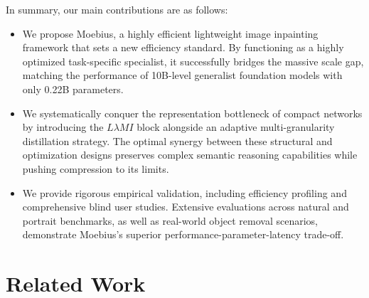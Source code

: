 \documentclass[runningheads]{llncs}
\begin{document}
\vspace{-0.01em}
In summary, our main contributions are as follows:
\vspace{-0.4em}
\begin{itemize}
    \item We propose Moebius, a highly efficient lightweight image inpainting framework that sets a new efficiency standard. By functioning as a highly optimized task-specific specialist, it successfully bridges the massive scale gap, matching the performance of 10B-level generalist foundation models with only 0.22B parameters.
    \item We systematically conquer the representation bottleneck of compact networks by introducing the $L\lambda MI$ block alongside an adaptive multi-granularity distillation strategy. The optimal synergy between these structural and optimization designs preserves complex semantic reasoning capabilities while pushing compression to its limits.
    \item We provide rigorous empirical validation, including efficiency profiling and comprehensive blind user studies. Extensive evaluations across natural and portrait benchmarks, as well as real-world object removal scenarios, demonstrate Moebius’s superior performance-parameter-latency trade-off.
\end{itemize}

\vspace{-1.2em}
\section{Related Work}\label{sec:related}
\vspace{-0.5em}
\end{document}
